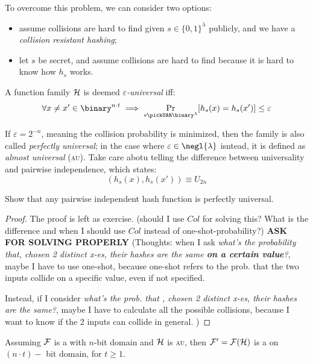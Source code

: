 To overcome this problem, we can consider two options:
\begin{itemize}
    \item assume collisions are hard to find given $s \in \{0,1\}^{\lambda}$ publicly, and we have a \textit{collision resistant hashing};
    \item let $s$ be secret, and assume collisions are hard to find because it is hard to know how $h_{s}$ works.
\end{itemize}

\begin{definition}
    A function family $\mathcal{H}$ is deemed \emph{$\varepsilon$-universal} iff:
    \[
        \forall x \neq x' \in \binary^{n\cdot t} \implies \Pr_{s \pickUAR \binary^\lambda}[h_s(x) = h_s(x') ] \leq \varepsilon  
    \]
\end{definition}

If $\varepsilon = 2^{-n}$, meaning the collision probability is minimized, then the family is also called \emph{perfectly universal}; in the case where $\varepsilon \in \negl{\lambda}$ isntead, it is defined as \emph{almost universal} (\textsc{au}). Take care abotu telling the difference between universality and pairwise independence, which states:
\[
    (h_s(x), h_s(x')) \equiv U_{2n}
\]

\begin{lemma}
    Show that any pairwise independent hash function is perfectly universal.
\end{lemma}

\begin{proof} The proof is left as exercise.
    (should I use $Col$ for solving this? What is the difference and when I should use $Col$ instead of one-shot-probability?) \textbf{ASK FOR SOLVING PROPERLY} (Thoughts: when I ask \textit{what's the probability that, chosen 2 distinct x-es, their hashes are the same \textbf{on a certain value}?}, maybe I have to use one-shot, because one-shot refers to the prob. that the two inputs collide on a specific value, even if not specified.

    Instead, if I consider \textit{what's the prob. that , chosen 2 distinct x-es, their hashes are the same?}, maybe I have to calculate all the possible collisions, because I want to know if the 2 inputs can collide in general. )
\end{proof}

\begin{theorem}
    Assuming $\mathcal{F}$ is a \prf{} with $n$-bit domain and $\mathcal{H}$ is \textsc{au}, then $\mathcal{F}' = \mathcal{F}(\mathcal{H})$ is a \prf{} on $(n\cdot t)-$ bit domain, for $t \geq 1$.
\end{theorem}

